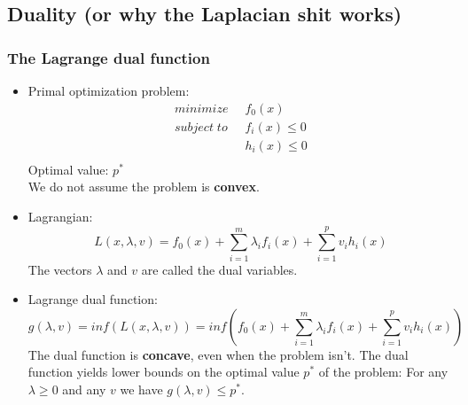 \subsection*{Duality (or why the Laplacian shit works)}
\subsubsection*{The Lagrange dual function}
\begin{itemize}
    \item
        Primal optimization problem:
        \begin{align*}
            minimize \; \; & f_0(x)\\
            subject \; to \; \; & f_i(x) \leq 0 \\ %
            & h_i(x) \leq 0 \\
        \end{align*}
        Optimal value: $p^*$\\
        We do not assume the problem is \textbf{convex}.
    \item
        Lagrangian:
        $$ L(x, \lambda, v) = f_0(x) + \sum_{i=1}^{m} \lambda_i f_i(x) + \sum_{i=1}^{p} v_i h_i(x)$$
        The vectors $\lambda$ and $v$ are called the dual variables.
    \item
        Lagrange dual function:
        $$ g(\lambda, v) = inf(L(x, \lambda, v)) = inf(f_0(x) + \sum_{i=1}^{m} \lambda_i f_i(x) + \sum_{i=1}^{p} v_i h_i(x))$$
        The dual function is \textbf{concave}, even when the problem isn't.
        The dual function yields lower bounds on the optimal value $p^*$ of the problem: For any $\lambda \geq 0$ and any $v$ we have $g(\lambda, v) \leq p^*$.
\end{itemize}
